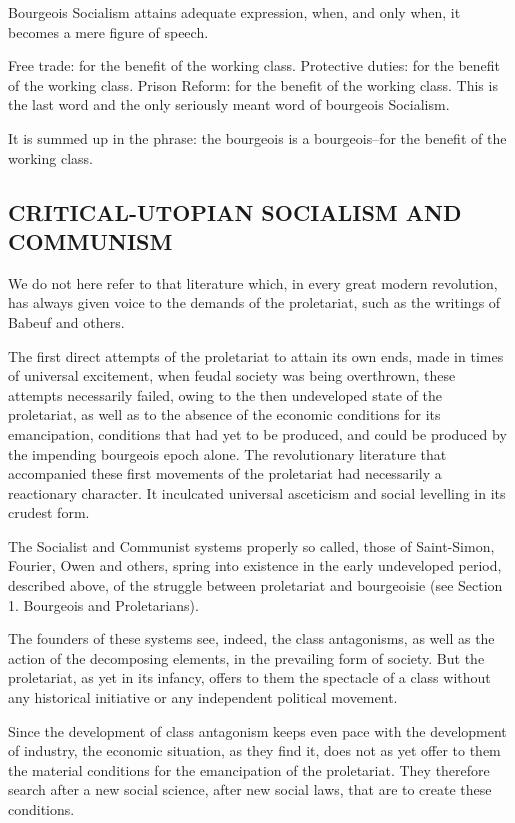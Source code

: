 \documentclass[, oneside]{article}   	%
\begin{document}
Bourgeois Socialism attains adequate expression, when, and only when, it becomes a mere figure of speech.

Free trade: for the benefit of the working class. Protective duties: for the benefit of the working class. Prison Reform: for the benefit of the working class. This is the last word and the only seriously meant word of bourgeois Socialism.

It is summed up in the phrase: the bourgeois is a bourgeois--for the benefit of the working class.

\subsection{CRITICAL-UTOPIAN SOCIALISM AND COMMUNISM}
We do not here refer to that literature which, in every great modern revolution, has always given voice to the demands of the proletariat, such as the writings of Babeuf and others.

The first direct attempts of the proletariat to attain its own ends, made in times of universal excitement, when feudal society was being overthrown, these attempts necessarily failed, owing to the then undeveloped state of the proletariat, as well as to the absence of the economic conditions for its emancipation, conditions that had yet to be produced, and could be produced by the impending bourgeois epoch alone. The revolutionary literature that accompanied these first movements of the proletariat had necessarily a reactionary character. It inculcated universal asceticism and social levelling in its crudest form.

The Socialist and Communist systems properly so called, those of Saint-Simon, Fourier, Owen and others, spring into existence in the early undeveloped period, described above, of the struggle between proletariat and bourgeoisie (see Section 1. Bourgeois and Proletarians).

The founders of these systems see, indeed, the class antagonisms, as well as the action of the decomposing elements, in the prevailing form of society. But the proletariat, as yet in its infancy, offers to them the spectacle of a class without any historical initiative or any independent political movement.

Since the development of class antagonism keeps even pace with the development of industry, the economic situation, as they find it, does not as yet offer to them the material conditions for the emancipation of the proletariat. They therefore search after a new social science, after new social laws, that are to create these conditions.
\end{document}
